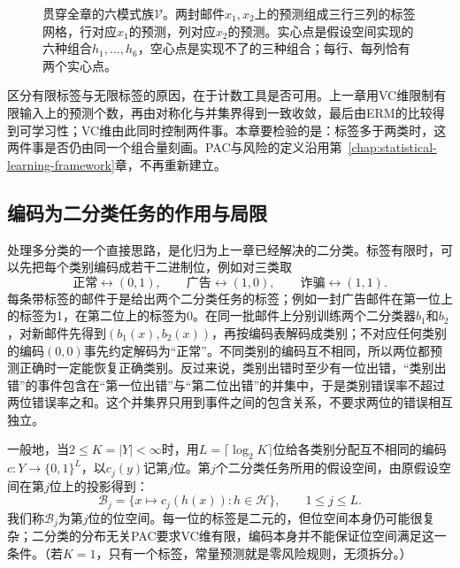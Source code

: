 \begin{figure}[htbp]
  \centering
  
  \caption{贯穿全章的六模式族$\mathcal V$。两封邮件$x_1,x_2$上的预测组成三行三列的标签网格，行对应$x_1$的预测，列对应$x_2$的预测。实心点是假设空间实现的六种组合$h_1,\ldots,h_6$，空心点是实现不了的三种组合；每行、每列恰有两个实心点。}
  \label{fig:comb-multiclass-pattern-grid}
  \label{fig:lt6-email-label-grid}
\end{figure}

区分有限标签与无限标签的原因，在于计数工具是否可用。上一章用VC维限制有限输入上的预测个数，再由对称化与并集界得到一致收敛，最后由ERM的比较得到可学习性；VC维由此同时控制两件事。本章要检验的是：标签多于两类时，这两件事是否仍由同一个组合量刻画。PAC与风险的定义沿用第~\ref{chap:statistical-learning-framework}章，不再重新建立。

\subsection{编码为二分类任务的作用与局限}
\label{sec:lt6-binary-encoding}

处理多分类的一个直接思路，是化归为上一章已经解决的二分类。标签有限时，可以先把每个类别编码成若干二进制位，例如对三类取
\[
 \text{正常}\longleftrightarrow(0,1),\qquad
 \text{广告}\longleftrightarrow(1,0),\qquad
 \text{诈骗}\longleftrightarrow(1,1).
\]
每条带标签的邮件于是给出两个二分类任务的标签；例如一封广告邮件在第一位上的标签为1，在第二位上的标签为0。在同一批邮件上分别训练两个二分类器$b_1$和$b_2$，对新邮件先得到$(b_1(x),b_2(x))$，再按编码表解码成类别；不对应任何类别的编码$(0,0)$事先约定解码为“正常”。不同类别的编码互不相同，所以两位都预测正确时一定能恢复正确类别。反过来说，类别出错时至少有一位出错，“类别出错”的事件包含在“第一位出错”与“第二位出错”的并集中，于是类别错误率不超过两位错误率之和。这个并集界只用到事件之间的包含关系，不要求两位的错误相互独立。

一般地，当$2\leq K=|Y|<\infty$时，用$L=\lceil\log_2K\rceil$位给各类别分配互不相同的编码$c:Y\to\{0,1\}^L$，以$c_j(y)$记第$j$位。第$j$个二分类任务所用的假设空间，由原假设空间在第$j$位上的投影得到：
\[
 \mathcal B_j=\{x\mapsto c_j(h(x)):h\in\mathcal H\},\qquad 1\leq j\leq L.
\]
我们称$\mathcal B_j$为第$j$位的位空间。每一位的标签是二元的，但位空间本身仍可能很复杂；二分类的分布无关PAC要求VC维有限，编码本身并不能保证位空间满足这一条件。（若$K=1$，只有一个标签，常量预测就是零风险规则，无须拆分。）

